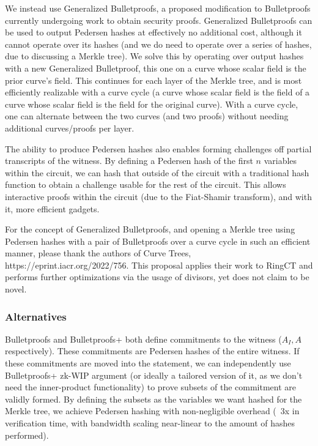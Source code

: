 \documentclass[]{article}
\begin{document}
We instead use Generalized Bulletproofs, a proposed modification to Bulletproofs currently undergoing work to obtain security proofs. Generalized Bulletproofs can be used to output Pedersen hashes at effectively no additional cost, although it cannot operate over its hashes (and we do need to operate over a series of hashes, due to discussing a Merkle tree). We solve this by operating over output hashes with a new Generalized Bulletproof, this one on a curve whose scalar field is the prior curve's field. This continues for each layer of the Merkle tree, and is most efficiently realizable with a curve cycle (a curve whose scalar field is the field of a curve whose scalar field is the field for the original curve). With a curve cycle, one can alternate between the two curves (and two proofs) without needing additional curves/proofs per layer.

The ability to produce Pedersen hashes also enables forming challenges off partial transcripts of the witness. By defining a Pedersen hash of the first $n$ variables within the circuit, we can hash that outside of the circuit with a traditional hash function to obtain a challenge usable for the rest of the circuit. This allows interactive proofs within the circuit (due to the Fiat-Shamir transform), and with it, more efficient gadgets.

For the concept of Generalized Bulletproofs, and opening a Merkle tree using Pedersen hashes with a pair of Bulletproofs over a curve cycle in such an efficient manner, please thank the authors of Curve Trees, https://eprint.iacr.org/2022/756. This proposal applies their work to RingCT and performs further optimizations via the usage of divisors, yet does not claim to be novel.

\subsubsection{Alternatives}

Bulletproofs and Bulletproofs+ both define commitments to the witness ($A_I, A$ respectively). These commitments are Pedersen hashes of the entire witness. If these commitments are moved into the statement, we can independently use Bulletproofs+ zk-WIP argument (or ideally a tailored version of it, as we don't need the inner-product functionality) to prove subsets of the commitment are validly formed. By defining the subsets as the variables we want hashed for the Merkle tree, we achieve Pedersen hashing with non-negligible overhead (~3x in verification time, with bandwidth scaling near-linear to the amount of hashes performed).
\end{document}
